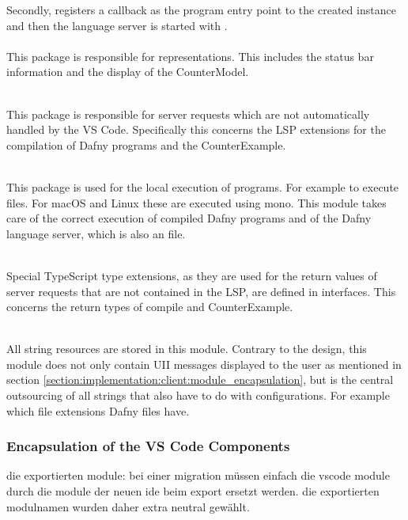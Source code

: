 Secondly,  registers a callback as the program entry point to the created  instance
and then the language server is started with . \\

\textbf{}\\
This package is responsible for representations. This includes the status bar information and the display of the CounterModel.

\textbf{}\\
This package is responsible for server requests which are not automatically handled by the VS Code.
Specifically this concerns the LSP extensions for the compilation of Dafny programs and the CounterExample.

\textbf{}\\
This package is used for the local execution of programs.
For example to execute  files.
For macOS and Linux these are executed using mono.
This module takes care of the correct execution of compiled Dafny programs
and of the Dafny language server, which is also an  file.

\textbf{}\\
Special TypeScript type extensions,
as they are used for the return values of server requests
that are not contained in the LSP, are defined in interfaces.
This concerns the return types of compile and CounterExample.

\textbf{}\\
All string resources are stored in this module.
Contrary to the design, this module does not only contain UII messages displayed to the user as mentioned in section
\ref{section:implementation:client:module_encapsulation},
but is the central outsourcing of all strings that also have to do with configurations.
For example which file extensions Dafny files have.


\subsubsection{Encapsulation of the VS Code Components}

die exportierten module:
bei einer migration müssen einfach die vscode module durch die module der neuen ide beim export ersetzt werden.
die exportierten modulnamen wurden daher extra neutral gewählt.

